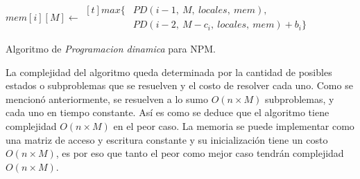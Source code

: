 \begin{algorithm}
    \begin{algorithmic}[1]
            \EndIf
            \EndIf
                \State $mem[i][M] \gets \begin{aligned}[t]
                    max\{&PD(i - 1,\ M,\ locales,\ mem),\\
                    &PD(i-2,\ M - c_i,\ locales,\ mem) + b_i \}
                \end{aligned}$
            \EndIf
        \EndFunction
    \end{algorithmic}
    \caption{Algoritmo de \textit{Programacion dinamica} para NPM.}
    \label{alg:programacion_dinamica}
\end{algorithm}

La complejidad del algoritmo queda determinada por la cantidad de posibles estados o subproblemas que se resuelven y el costo de resolver cada uno. Como se mencionó anteriormente, se resuelven a lo sumo $O(n\times M)$ subproblemas, y cada uno en tiempo constante. Así es como se deduce que el algoritmo tiene complejidad $O(n\times M)$ en el peor caso. La memoria se puede implementar como una matriz de acceso y escritura constante y su inicialización tiene un costo $O(n\times M)$, es por eso que tanto el peor como mejor caso tendrán complejidad $O(n\times M)$.
